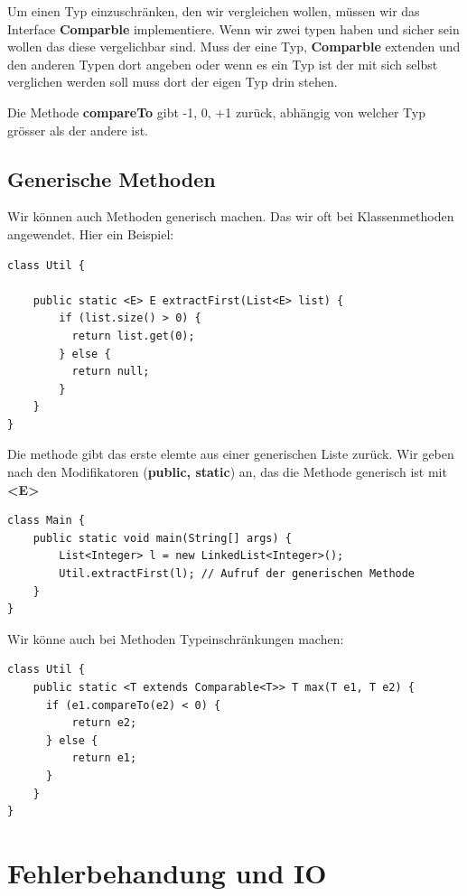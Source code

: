 \documentclass[12pt]{article}
\begin{document}
    Um einen Typ einzuschränken, den wir vergleichen wollen, müssen wir das 
    Interface \textbf{Comparble} implementiere. Wenn wir zwei typen haben und 
    sicher sein wollen das diese vergelichbar sind. Muss der eine Typ, \textbf{Comparble}
    extenden und den anderen Typen dort angeben oder wenn es ein Typ ist der mit sich selbst verglichen 
    werden soll muss dort der eigen Typ drin stehen. 

    Die Methode \textbf{compareTo} gibt -1, 0, +1 zurück, abhängig von welcher Typ grösser als der andere ist. 

    \subsection*{Generische Methoden}

    Wir können auch Methoden generisch machen. Das wir oft bei Klassenmethoden angewendet. 
    Hier ein Beispiel:

    \begin{lstlisting}[caption=return first]
class Util {

    public static <E> E extractFirst(List<E> list) {
        if (list.size() > 0) { 
          return list.get(0);
        } else { 
          return null;
        }
    }
}
    \end{lstlisting}

    Die methode gibt das erste elemte aus einer generischen Liste zurück. 
    Wir geben nach den Modifikatoren (\textbf{public, static}) an, das die Methode generisch ist mit \textbf{<E>}

    \begin{lstlisting}[caption=anwendung]
class Main {
    public static void main(String[] args) {
        List<Integer> l = new LinkedList<Integer>();
        Util.extractFirst(l); // Aufruf der generischen Methode
    }
}
    \end{lstlisting}

    Wir könne auch bei Methoden Typeinschränkungen machen:

    \begin{lstlisting}
class Util {
    public static <T extends Comparable<T>> T max(T e1, T e2) {
      if (e1.compareTo(e2) < 0) {
          return e2;
      } else {
          return e1;
      }
    }
}
    \end{lstlisting}

    \section*{Fehlerbehandung und IO}
\end{document}
